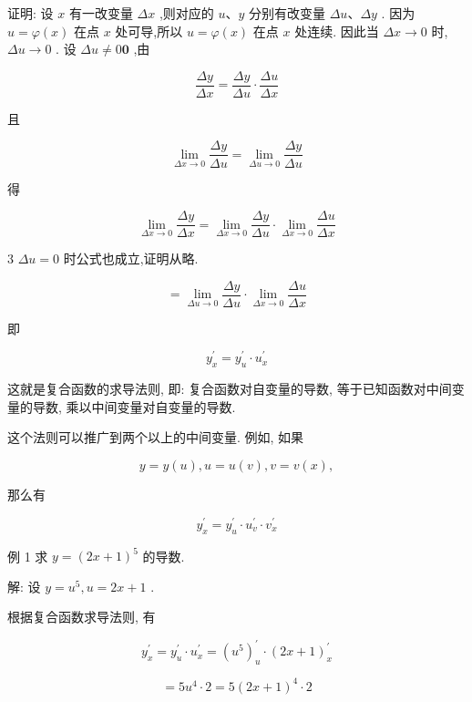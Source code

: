 \documentclass[lang=cn,newtx,12pt,scheme=chinese]{elegantbook}
\begin{document}
证明: 设 \(x\) 有一改变量 \({\Delta x}\) ,则对应的 \(u\text{、}y\) 分别有改变量 \({\Delta u}\text{、}{\Delta y}\) . 因为 \(u = \varphi \left( x\right)\) 在点 \(x\) 处可导,所以 \(u = \varphi \left( x\right)\) 在点 \(x\) 处连续. 因此当 \({\Delta x} \rightarrow 0\) 时, \({\Delta u} \rightarrow 0\) . 设 \({\Delta u} \neq 0\mathbf{0}\) ,由

\[
\frac{\Delta y}{\Delta x} = \frac{\Delta y}{\Delta u} \cdot \frac{\Delta u}{\Delta x}
\]

且

\[
\mathop{\lim }\limits_{{{\Delta x} \rightarrow 0}}\frac{\Delta y}{\Delta u} = \mathop{\lim }\limits_{{{\Delta u} \rightarrow 0}}\frac{\Delta y}{\Delta u}
\]

得

\[
\mathop{\lim }\limits_{{{\Delta x} \rightarrow 0}}\frac{\Delta y}{\Delta x} = \mathop{\lim }\limits_{{{\Delta x} \rightarrow 0}}\frac{\Delta y}{\Delta u} \cdot \mathop{\lim }\limits_{{{\Delta x} \rightarrow 0}}\frac{\Delta u}{\Delta x}
\]

3 \({\Delta u} = 0\) 时公式也成立,证明从略.

\[
= \mathop{\lim }\limits_{{{\Delta u} \rightarrow 0}}\frac{\Delta y}{\Delta u} \cdot \mathop{\lim }\limits_{{{\Delta x} \rightarrow 0}}\frac{\Delta u}{\Delta x}
\]

即

\[
{y}_{x}^{\prime } = {y}_{u}^{\prime } \cdot {u}_{x}^{\prime }
\]

这就是复合函数的求导法则, 即: 复合函数对自变量的导数, 等于已知函数对中间变量的导数, 乘以中间变量对自变量的导数.

这个法则可以推广到两个以上的中间变量. 例如, 如果

\[
y = y\left( u\right) ,u = u\left( v\right) ,v = v\left( x\right) ,
\]

那么有

\[
{y}_{x}^{\prime } = {y}_{u}^{\prime } \cdot {u}_{v}^{\prime } \cdot {v}_{x}^{\prime }
\]

例 1 求 \(y = {\left( 2x + 1\right) }^{5}\) 的导数.

解: 设 \(y = {u}^{5},u = {2x} + 1\) .

根据复合函数求导法则, 有

\[
{y}_{x}^{\prime } = {y}_{u}^{\prime } \cdot {u}_{x}^{\prime } = {\left( {u}^{5}\right) }_{u}^{\prime } \cdot {\left( 2x + 1\right) }_{x}^{\prime }
\]

\[
= 5{u}^{4} \cdot 2 = 5{\left( 2x + 1\right) }^{4} \cdot 2
\]
\end{document}
